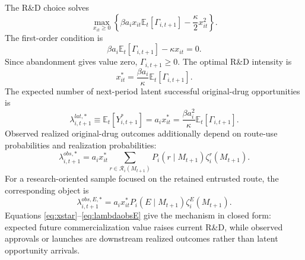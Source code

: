 \documentclass[12pt]{article}
\newcommand{\E}{\mathbb{E}}
\newcommand{\1}{\mathbf{1}}
\newcommand{\calR}{\mathcal{R}}
\begin{document}
The R\&D choice solves
\begin{equation}
\max_{x_{it}\ge0}\left\{
\beta a_i x_{it}\E_t[\Gamma_{i,t+1}]
-\frac{\kappa}{2}x_{it}^2
\right\}.
\label{eq:xproblem}
\end{equation}
The first-order condition is
\begin{equation}
    \beta a_i\E_t[\Gamma_{i,t+1}]-\kappa x_{it}=0.
    \label{eq:foc}
\end{equation}
Since abandonment gives value zero, $\Gamma_{i,t+1}\ge0$. The optimal R\&D intensity is
\begin{equation}
    x^*_{it}=\frac{\beta a_i}{\kappa}\E_t[\Gamma_{i,t+1}].
    \label{eq:xstar}
\end{equation}
The expected number of next-period latent successful original-drug opportunities is
\begin{equation}
    \lambda^{lat,*}_{i,t+1}\equiv \E_t[Y^*_{i,t+1}]
    =a_i x^*_{it}
    =\frac{\beta a_i^2}{\kappa}\E_t[\Gamma_{i,t+1}].
    \label{eq:lambdastar}
\end{equation}
Observed realized original-drug outcomes additionally depend on route-use probabilities and realization probabilities:
\begin{equation}
    \lambda^{obs,*}_{i,t+1}
    =
    a_i x^*_{it}
    \sum_{r\in\calR_i(M_{t+1})}
    P_i(r\mid M_{t+1})\zeta_i^r(M_{t+1}).
    \label{eq:lambdaobs}
\end{equation}
For a research-oriented sample focused on the retained entrusted route, the corresponding object is
\begin{equation}
    \lambda^{obs,E,*}_{i,t+1}
    =
    a_i x^*_{it}
    P_i(E\mid M_{t+1})
    \zeta_i^E(M_{t+1}).
    \label{eq:lambdaobsE}
\end{equation}
Equations \eqref{eq:xstar}--\eqref{eq:lambdaobsE} give the mechanism in closed form: expected future commercialization value raises current R\&D, while observed approvals or launches are downstream realized outcomes rather than latent opportunity arrivals.
\end{document}
